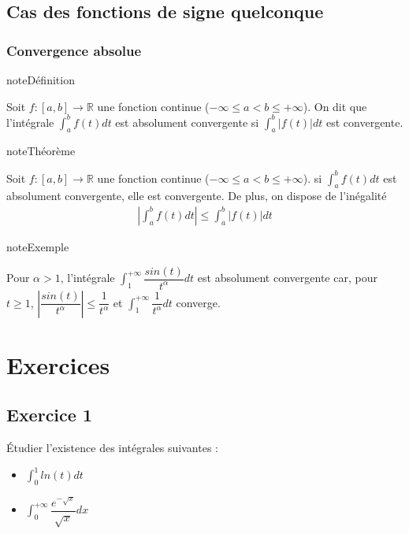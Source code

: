 \documentclass[letterpaper,10pt,french]{sphinxmanual}
\begin{document}
\subsection{Cas des fonctions de signe quelconque}
\label{\detokenize{def:cas-des-fonctions-de-signe-quelconque}}

\subsubsection{Convergence absolue}
\label{\detokenize{def:convergence-absolue}}
\begin{sphinxadmonition}{note}{Définition}

\sphinxAtStartPar
Soit \(f : [a, b] \to \mathbb R\) une fonction continue (\(-\infty \leq a < b \leq +\infty\)). On dit que l’intégrale \(\int_a^b f(t)dt\) est absolument convergente si \(\int_a^b |f(t)|dt\) est convergente.
\end{sphinxadmonition}

\begin{sphinxadmonition}{note}{Théorème}

\sphinxAtStartPar
Soit \(f : [a, b] \to \mathbb R\) une fonction continue (\(-\infty \leq a < b \leq +\infty\)). si \(\int_a^b f(t)dt\) est absolument convergente, elle est convergente. De plus, on dispose de l’inégalité
\begin{equation*}
\begin{split}
\left | \int_a^b f(t)dt\right | \leq \int_a^b |f(t)|dt
\end{split}
\end{equation*}\end{sphinxadmonition}

\begin{sphinxadmonition}{note}{Exemple}

\sphinxAtStartPar
Pour \(\alpha >1\), l’intégrale \(\int_1^{+\infty} \dfrac{sin(t)}{t^\alpha}dt\) est absolument convergente car, pour \(t\geq 1\), \(\left |\dfrac{sin(t)}{t^\alpha} \right | \leq \dfrac{1}{t^\alpha}\) et \(\int_1^{+\infty} \dfrac{1}{t^\alpha}dt\) converge.
\end{sphinxadmonition}


\section{Exercices}
\label{\detokenize{exo3:exercices}}\label{\detokenize{exo3::doc}}

\subsection{Exercice 1}
\label{\detokenize{exo3:exercice-1}}
\sphinxAtStartPar
Étudier l’existence des intégrales suivantes :
\begin{itemize}
\item {} 
\sphinxAtStartPar
\(\int_0^1 ln(t)dt\)

\item {} 
\sphinxAtStartPar
\(\int_0^{+\infty} \dfrac{e^{-\sqrt{x}}}{\sqrt{x}} dx\)

\end{itemize}
\end{document}
